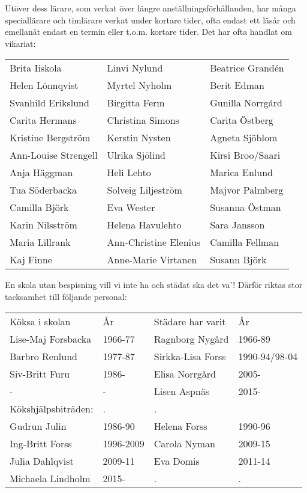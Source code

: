 Utöver dess lärare, som verkat över längre anställningsförhållanden, har många speciallärare och timlärare verkat under kortare tider, ofta
endast ett läsår och emellanåt endast en termin eller t.o.m. kortare tider. Det har ofta handlat om vikariat:
\begin{center}
  \begin{tabular}{l l l}
    \hline
    Brita Iiskola & Linvi Nylund & Beatrice Grandén \\
    Helen Lönnqvist & Myrtel Nyholm & Berit Edman \\
    Svanhild Erikslund & Birgitta Ferm & Gunilla Norrgård \\
    Carita Hermans & Christina Simons & Carita Östberg \\
    Kristine Bergström & Kerstin Nysten & Agneta Sjöblom \\
    Ann-Louise Strengell & Ulrika Sjölind & Kirsi Broo/Saari \\
    Anja Häggman & Heli Lehto & Marica Enlund \\
    Tua Söderbacka & Solveig Liljeström & Majvor Palmberg \\
    Camilla Björk & Eva Wester & Susanna Östman \\
    Karin Nilsström & Helena Havulehto & Sara Jansson \\
    Maria Lillrank & Ann-Christine Elenius & Camilla Fellman \\
    Kaj Finne & Anne-Marie Virtanen & Susann Björk \\
    \hline
  \end{tabular}
\end{center}

En skola utan bespisning vill vi inte ha och städat ska det va'! Därför riktas stor tacksamhet till följande personal:
\begin{center}
  \begin{tabular}{l l l l}
    \hline
    Köksa i skolan & År & Städare har varit & År \\
    Lise-Maj Forsbacka & 1966-77 & Ragnborg Nygård & 1966-89 \\
    Barbro Renlund & 1977-87 & Sirkka-Lisa Forss & 1990-94/98-04 \\
    Siv-Britt Furu & 1986- &  Elisa Norrgård & 2005- \\
    - & - & Lisen Aspnäs & 2015- \\
    Kökshjälpsbiträden: & . & . & \\
    Gudrun Julin & 1986-90 & Helena Forss & 1990-96 \\
    Ing-Britt Forss & 1996-2009 & Carola Nyman & 2009-15 \\
    Julia Dahlqvist & 2009-11 & Eva Domis & 2011-14 \\
    Michaela Lindholm & 2015- & . & .  \\
    \hline
  \end{tabular}
\end{center}

